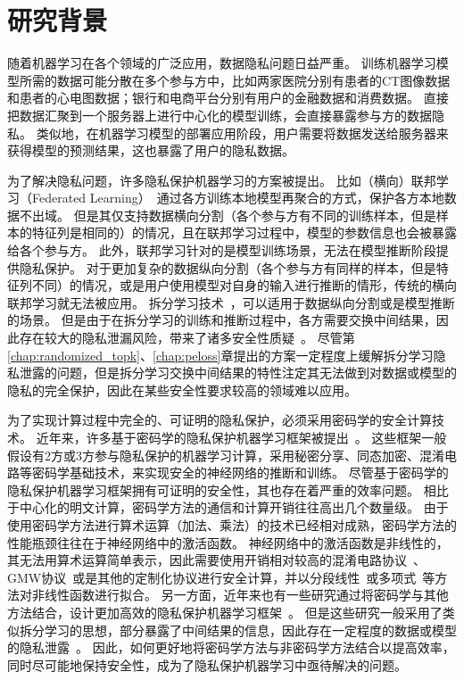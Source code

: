 \section{研究背景}
随着机器学习在各个领域的广泛应用，数据隐私问题日益严重。
%
训练机器学习模型所需的数据可能分散在多个参与方中，比如两家医院分别有患者的CT图像数据和患者的心电图数据；银行和电商平台分别有用户的金融数据和消费数据。
%
直接把数据汇聚到一个服务器上进行中心化的模型训练，会直接暴露参与方的数据隐私。
%
类似地，在机器学习模型的部署应用阶段，用户需要将数据发送给服务器来获得模型的预测结果，这也暴露了用户的隐私数据。

%
为了解决隐私问题，许多隐私保护机器学习的方案被提出。
%
比如（横向）联邦学习（Federated Learning）~\cite{yangqiang2019federated,mcmahan_2017_fedavg}通过各方训练本地模型再聚合的方式，保护各方本地数据不出域。
但是其仅支持数据横向分割（各个参与方有不同的训练样本，但是样本的特征列是相同的）的情况，且在联邦学习过程中，模型的参数信息也会被暴露给各个参与方。
此外，联邦学习针对的是模型训练场景，无法在模型推断阶段提供隐私保护。
%
对于更加复杂的数据纵向分割（各个参与方有同样的样本，但是特征列不同）的情况，或是用户使用模型对自身的输入进行推断的情形，传统的横向联邦学习就无法被应用。
%
拆分学习技术~\cite{vepakomma2018split}，可以适用于数据纵向分割或是模型推断的场景。
但是由于在拆分学习的训练和推断过程中，各方需要交换中间结果，因此存在较大的隐私泄漏风险，带来了诸多安全性质疑~\cite{abuadbba2020can_split,hezecheng_2019_model_inversion_attack}。
尽管第\ref{chap:randomized_topk}、\ref{chap:peloss}章提出的方案一定程度上缓解拆分学习隐私泄露的问题，但是拆分学习交换中间结果的特性注定其无法做到对数据或模型的隐私的完全保护，因此在某些安全性要求较高的领域难以应用。

为了实现计算过程中完全的、可证明的隐私保护，必须采用密码学的安全计算技术。
%
近年来，许多基于密码学的隐私保护机器学习框架被提出~\cite{mohassel2017secureml,wagh2019securenn,mohassel2018aby3}。
%
这些框架一般假设有2方或3方参与隐私保护的机器学习计算，采用秘密分享、同态加密、混淆电路等密码学基础技术，来实现安全的神经网络的推断和训练。
%
尽管基于密码学的隐私保护机器学习框架拥有可证明的安全性，其也存在着严重的效率问题。
相比于中心化的明文计算，密码学方法的通信和计算开销往往高出几个数量级。
%
由于使用密码学方法进行算术运算（加法、乘法）的技术已经相对成熟，密码学方法的性能瓶颈往往在于神经网络中的激活函数。
%
神经网络中的激活函数是非线性的，其无法用算术运算简单表示，因此需要使用开销相对较高的混淆电路协议~\cite{yao1986gc}、GMW协议~\cite{gmw_1987}或是其他的定制化协议进行安全计算，并以分段线性~\cite{mohassel2017secureml}或多项式~\cite{gilad2016cryptonets}等方法对非线性函数进行拟合。
%
另一方面，近年来也有一些研究通过将密码学与其他方法结合，设计更加高效的隐私保护机器学习框架~\cite{zhangqiao_2018_gelu_net,xiepeichen_2019_bayhenn,zhou_2022_codesign}。
%
但是这些研究一般采用了类似拆分学习的思想，部分暴露了中间结果的信息，因此存在一定程度的数据或模型的隐私泄露~\cite{wong_2020_lwe_model,abuadbba2020can_split,hezecheng_2019_model_inversion_attack}。
%
因此，如何更好地将密码学方法与非密码学方法结合以提高效率，同时尽可能地保持安全性，成为了隐私保护机器学习中亟待解决的问题。
